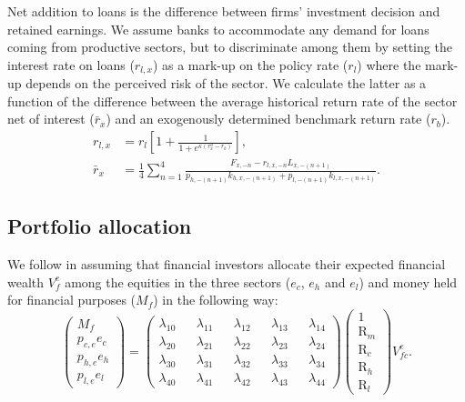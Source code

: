 \documentclass[authoryear]{article}
\begin{document}
Net addition to loans is the difference between firms' investment decision and retained earnings.
We assume banks to accommodate any demand for loans coming from productive sectors, but to discriminate among them by setting the interest rate on loans ($r_{l,x}$) as a mark-up on the policy rate ($r_l$) where the mark-up depends on the perceived risk of the sector. We calculate the latter as a function of the difference between the average historical return rate of the sector net of interest ($\bar{r}_x$) and an exogenously determined benchmark return rate ($r_b$).
\begin{align}
r_{l,x} &= r_l\left[1 + \frac{1}{1 + e^{\kappa(r_x^a - r_b)}} \right], \\
\bar{r}_x&=\frac{1}{4}\sum_{n=1}^{4}\frac{F_{x,-n}-r_{l,x,-n}L_{x,-(n+1)}}{p_{h,-(n+1)}k_{h,x,-(n+1)}+p_{l,-(n+1)} k_{l,x,-(n+1)}}.
\end{align}

\subsection{Portfolio allocation}
\label{sec:port}

We follow \citet{Brainard1968} in assuming that financial investors allocate their expected financial wealth $V^e_{f}$ among the equities in the three sectors ($e_c$, $e_h$ and $e_l$) and money held for financial purposes ($M_f$) in the following way:
\begin{equation}
\left(
\begin{matrix} M_f \\ p_{c,e}e_c \\ p_{h,e}e_h \\ p_{l,e}e_l \end{matrix}
\right)
=\left(
\begin{matrix}
	\lambda_{10} && \lambda_{11} && \lambda_{12} && \lambda_{13} && \lambda_{14} \\
	\lambda_{20} && \lambda_{21} && \lambda_{22} && \lambda_{23} && \lambda_{24} \\
	\lambda_{30} && \lambda_{31} && \lambda_{32} && \lambda_{33} && \lambda_{34} \\
	\lambda_{40} && \lambda_{41} && \lambda_{42} && \lambda_{43} && \lambda_{44}
\end{matrix}
\right)
\left(
\begin{matrix} 1 \\ \text{R}_m \\ \text{R}_c \\ \text{R}_h \\ \text{R}_l \end{matrix}
\right) V^e_{fc}.
\label{eq:portfolio}
\end{equation}
\end{document}
